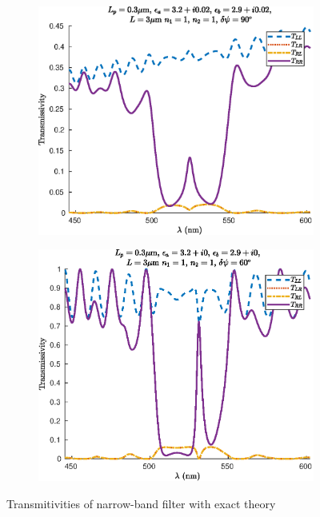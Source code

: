 \begin{figure}
\begin{subfigure}{0.49\linewidth}
		\includegraphics[width=\linewidth]{plots/defect/reflectivity_losses/oseen_transmission}
		\caption{}
	\end{subfigure}
	\begin{subfigure}{0.49\linewidth}
		\includegraphics[width=\linewidth]{plots/defect/reflectivity_other_defect/oseen_transmission}
		\caption{}
	\end{subfigure}
	\caption[Transmitivities of the narrow-band filter, exact theory]{Transmitivities of narrow-band filter with exact theory}
	\label{fig:transitivities_narrow_appendix_exact}
\end{figure}

